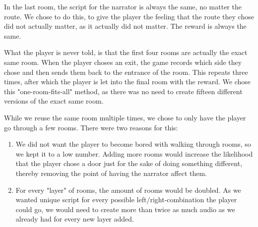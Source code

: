 In the last room, the script for the narrator is always the same, no matter the route. We chose to do this, to give the player the feeling that the route they chose did not actually matter, as it actually did not matter. The reward is always the same.

What the player is never told, is that the first four rooms are actually the exact same room. When the player choses an exit, the game records which side they chose and then sends them back to the entrance of the room. This repeats three times, after which the player is let into the final room with the reward. We chose this "one-room-fits-all" method, as there was no need to create fifteen different versions of the exact same room.

While we reuse the same room multiple times, we chose to only have the player go through a few rooms. There were two reasons for this:
\begin{enumerate}
	\item We did not want the player to become bored with walking through rooms, so we kept it to a low number. Adding more rooms would increase the likelihood that the player chose a door just for the sake of doing something different, thereby removing the point of having the narrator affect them.
	\item For every "layer" of rooms, the amount of rooms would be doubled. As we wanted unique script for every possible left/right-combination the player could go, we would need to create more than twice as much audio as we already had for every new layer added.
\end{enumerate}